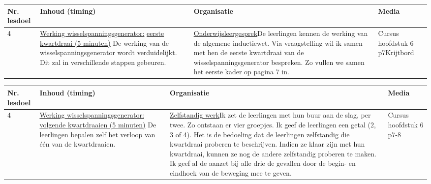 \begin{landscape}
\begin{tabularx}{1.56\textwidth}{|p{1.5cm}|p{8cm}|X|p{4cm}|}
	\hline
	\textbf{Nr. lesdoel } & \textbf{Inhoud (timing)}  & \textbf{Organisatie } & \textbf{Media } \\ \hline
	4& \underline{Werking wisselspanningsgenerator:} \underline{eerste kwartdraai (5 minuten)}\newline
	De werking van de wisselspanningsgenerator wordt verduidelijkt. Dit zal in verschillende stappen gebeuren.
	&  \underline{Onderwijsleergesprek}\newline  De leerlingen kennen de werking van de algemene inductiewet. Via vraagstelling wil ik samen met hen de eerste kwartdraai van de wisselspanningsgenerator bespreken. Zo vullen we samen het eerste kader op pagina 7 in.
	&  Cursus hoofdstuk 6 p7\newline\newline Krijtbord
	\\ \hline
\end{tabularx}\vspace{5mm}


\begin{tabularx}{1.56\textwidth}{|p{1.5cm}|p{8cm}|X|p{4cm}|}
\hline
\textbf{Nr. lesdoel } & \textbf{Inhoud (timing)}  & \textbf{Organisatie } & \textbf{Media } \\ \hline
4& \underline{Werking wisselspanningsgenerator:} \underline{volgende kwartdraaien (5 minuten)}\newline
De leerlingen bepalen zelf het verloop van één van de kwartdraaien. 
&  \underline{Zelfstandig werk}\newline  Ik zet de leerlingen met hun buur aan de slag, per twee. Zo ontstaan er vier groepjes. Ik geef de leerlingen een getal (2, 3 of 4). Het is de bedoeling dat de leerlingen zelfstandig die kwartdraai proberen te beschrijven. Indien ze klaar zijn met hun kwartdraai, kunnen ze nog de andere zelfstandig proberen te maken. Ik geef al de aanzet bij alle drie de gevallen door de begin- en eindhoek van de beweging mee te geven.
&  Cursus hoofdstuk 6 p7-8
\\ \hline
\end{tabularx}\vspace{5mm}


\end{landscape}
